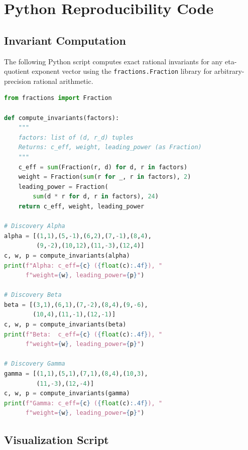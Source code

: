 \section{Python Reproducibility Code}
\label{app:python}

\subsection{Invariant Computation}

The following Python script computes exact rational invariants
for any eta-quotient exponent vector using the
\texttt{fractions.Fraction} library for arbitrary-precision
rational arithmetic.

\begin{lstlisting}[language=Python, caption={Generic
  eta-quotient invariant computation.}]
from fractions import Fraction

def compute_invariants(factors):
    """
    factors: list of (d, r_d) tuples
    Returns: c_eff, weight, leading_power (as Fraction)
    """
    c_eff = sum(Fraction(r, d) for d, r in factors)
    weight = Fraction(sum(r for _, r in factors), 2)
    leading_power = Fraction(
        sum(d * r for d, r in factors), 24)
    return c_eff, weight, leading_power

# Discovery Alpha
alpha = [(1,1),(5,-1),(6,2),(7,-1),(8,4),
         (9,-2),(10,12),(11,-3),(12,4)]
c, w, p = compute_invariants(alpha)
print(f"Alpha: c_eff={c} ({float(c):.4f}), "
      f"weight={w}, leading_power={p}")

# Discovery Beta
beta = [(3,1),(6,1),(7,-2),(8,4),(9,-6),
        (10,4),(11,-1),(12,-1)]
c, w, p = compute_invariants(beta)
print(f"Beta:  c_eff={c} ({float(c):.4f}), "
      f"weight={w}, leading_power={p}")

# Discovery Gamma
gamma = [(1,1),(5,1),(7,1),(8,4),(10,3),
         (11,-3),(12,-4)]
c, w, p = compute_invariants(gamma)
print(f"Gamma: c_eff={c} ({float(c):.4f}), "
      f"weight={w}, leading_power={p}")
\end{lstlisting}

\subsection{Visualization Script}

